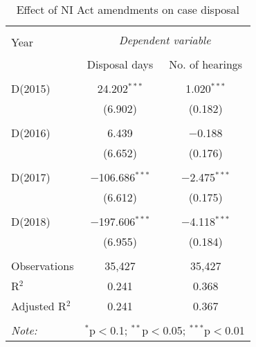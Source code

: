 \begin{table}
 \centering
 \caption{Effect of NI Act amendments on case
 disposal}\label{tab:amendments_effect}
 \footnotesize
 \begin{tabular}{@{\extracolsep{5pt}}lcc}
 \\[-1.8ex] 
 \hline \\[-1.8ex] 
 \multirow{2}{*}{Year} & \multicolumn{2}{c}{\textit{Dependent variable}} \\ 
 \cline{2-3} 
 \\[-1.8ex] & Disposal days & No. of hearings \\ 
 \hline \\[-1.8ex] 
 D(2015) & 24.202$^{***}$ & 1.020$^{***}$ \\ 
 & (6.902) & (0.182) \\ 
 & & \\ 
 D(2016) & 6.439 & $-$0.188 \\ 
 & (6.652) & (0.176) \\ 
 & & \\ 
 D(2017) & $-$106.686$^{***}$ & $-$2.475$^{***}$ \\ 
 & (6.612) & (0.175) \\ 
 & & \\ 
 D(2018) & $-$197.606$^{***}$ & $-$4.118$^{***}$ \\ 
 & (6.955) & (0.184) \\
 \hline \\[-1.8ex] 
 Observations & 35,427 & 35,427 \\ 
 R$^{2}$ & 0.241 & 0.368 \\ 
 Adjusted R$^{2}$ & 0.241 & 0.367 \\ 
 \hline \\[-1.8ex] 
 \textit{Note:} & \multicolumn{2}{r}{$^{*}$p$<$0.1; $^{**}$p$<$0.05; $^{***}$p$<$0.01} \\ 
 \end{tabular} 
\end{table}



